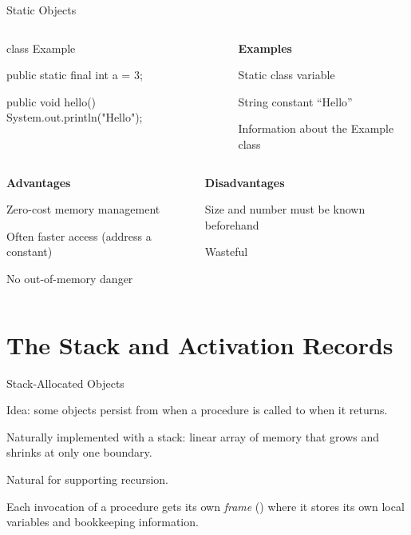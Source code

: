 \documentclass{plt}
\begin{document}
\begin{frame}[fragile]{Static Objects}

\vspace{10pt}
\begin{columns}
\begin{column}{0.6\textwidth}
\begin{java}
class Example {
  public static final int a = 3;

  public void hello() {
    System.out.println("Hello");
  }
}
\end{java}
\end{column}
\begin{column}{0.4\textwidth}
\textbf{Examples}

\baselineskip
Static class variable

String constant ``Hello''

Information about the Example class
\end{column}
\end{columns}

\vspace{\baselineskip}

\begin{columns}[t]
\begin{column}{0.5\textwidth}
\baselineskip
\textbf{Advantages}


Zero-cost memory management

Often faster access (address a constant)

No out-of-memory danger

\end{column}
\begin{column}{0.5\textwidth}
\baselineskip
\textbf{Disadvantages}

Size and number must be known beforehand

Wasteful
\end{column}
\end{columns}

\end{frame}

\part{The Stack and Activation Records}

\begin{frame}{Stack-Allocated Objects}

\alert{Idea}: some objects persist from when a procedure is called to
when it returns.

Naturally implemented with a stack: linear array of memory that grows
and shrinks at only one boundary.

Natural for supporting recursion. 


Each invocation of a procedure gets its own \alert{\emph{frame}}
() where it stores its own local variables and
bookkeeping information.

\end{frame}
\end{document}
